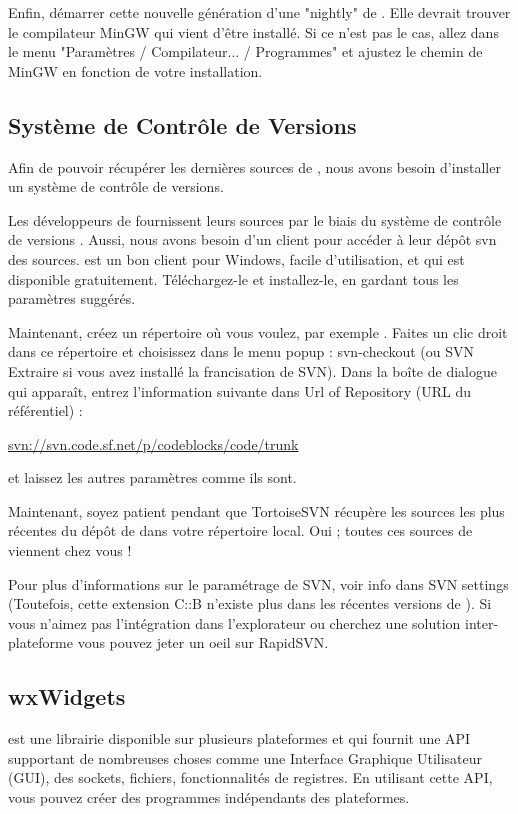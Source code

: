 Enfin, démarrer cette nouvelle génération d'une "nightly" de \codeblocks. Elle devrait trouver le compilateur MinGW qui vient d'être installé. Si ce n'est pas le cas, allez dans le menu "Paramètres / Compilateur... / Programmes" et ajustez le chemin de MinGW en fonction de votre installation.

\subsection{Système de Contrôle de Versions}

Afin de pouvoir récupérer les dernières sources de \codeblocks, nous avons besoin d'installer un système de contrôle de versions.

Les développeurs de \codeblocks fournissent leurs sources par le biais du système de contrôle de versions \cite{url:subversion}. Aussi, nous avons besoin d'un client pour accéder à leur dépôt svn des sources. \cite{url:tortoisesvn} est un bon client pour Windows, facile d'utilisation, et qui est disponible gratuitement. Téléchargez-le et installez-le, en gardant tous les paramètres suggérés.

Maintenant, créez un répertoire où vous voulez, par exemple . Faites un clic droit dans ce répertoire et choisissez dans le menu popup : svn-checkout (ou SVN Extraire si vous avez installé la francisation de SVN). Dans la boîte de dialogue qui apparaît, entrez l'information suivante dans Url of Repository (URL du référentiel) :

\url{svn://svn.code.sf.net/p/codeblocks/code/trunk}

et laissez les autres paramètres comme ils sont.

Maintenant, soyez patient pendant que TortoiseSVN récupère les sources les plus récentes du dépôt de \codeblocks dans votre répertoire local. Oui ; toutes ces sources de \codeblocks viennent chez vous !

Pour plus d'informations sur le paramétrage de SVN, voir info dans SVN settings (Toutefois, cette extension C::B n'existe plus dans les récentes versions de \codeblocks). Si vous n'aimez pas l'intégration dans l'explorateur ou cherchez une solution inter-plateforme vous pouvez jeter un oeil sur RapidSVN.

\subsection{wxWidgets}

\cite{url:wx} est une librairie disponible sur plusieurs plateformes et qui fournit une API supportant de nombreuses choses comme une Interface Graphique Utilisateur (GUI), des sockets, fichiers, fonctionnalités de registres. En utilisant cette API, vous pouvez créer des programmes indépendants des plateformes.

